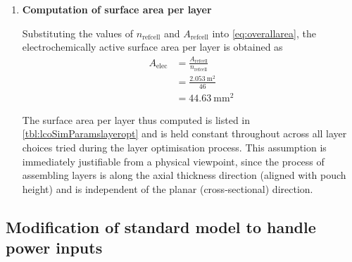 \begin{enumerate}[ label=\textbf{\arabic*}), leftmargin=0pt, itemindent=20pt, labelwidth=15pt, labelsep=5pt, listparindent=0.7cm, align=left]
        Since fractional layers do not have  any physical meaning, the number of
        layers that  can be  accommodated within  any pouch  must be  an integer
        quantity. Therefore,  $n_\text{refcell}$ is  computed as the  `floor' of
        the quantity in the \gls{rhs} of \cref{eq:stackheightrefcellmod}
        \begin{align}
            n_\text{refcell} &= \floor*{\frac{L_\text{stack}}{l_\text{Al} + l_\text{pos} + l_\text{sep} + l_\text{neg} + l_\text{Cu}}} \\
            {} &= \floor*{\frac{9.68}{(15 +  72 + 25 + 88 + 10) \times 10^{-3}}} \\
            n_\text{refcell} &= 46
        \end{align}

        The reference cell is thus deemed to consist of 46~layers.

    \item \textbf{Computation of surface area per layer}

        Substituting  the values  of  $n_\text{refcell}$ and  $A_\text{refcell}$
        into  \cref{eq:overallarea}, the  electrochemically active  surface area
        per layer is obtained as
        \begin{align}
            A_\text{elec} & = \frac{A_\text{refcell}}{n_\text{refcell}} \\
            {}            & = \frac{\SI{2.053}{\meter\squared}}{46}     \\
            {}            & = \SI{44.63}{\milli\meter\squared}
        \end{align}

        The   surface   area   per   layer    thus   computed   is   listed   in
        \cref{tbl:lcoSimParamslayeropt} and  is held constant  throughout across
        all  layer choices  tried during  the layer  optimisation process.  This
        assumption  is  immediately  justifiable   from  a  physical  viewpoint,
        since  the process  of assembling  layers is  along the  axial thickness
        direction (aligned with  pouch height) and is independent  of the planar
        (cross-sectional) direction.

\end{enumerate}

\subsection{Modification of standard  model to handle power inputs}\label{sec:innatepowerinput}

